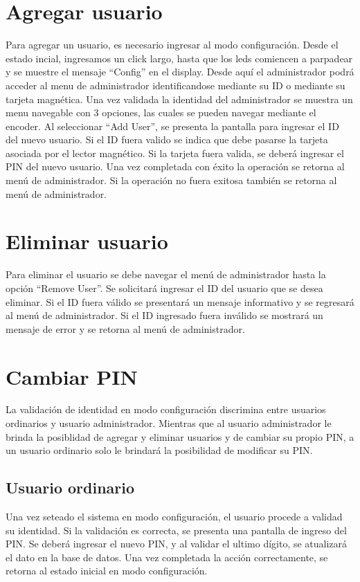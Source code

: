 \documentclass[10pt,a4paper]{article}
\begin{document}
\section{Agregar usuario}
Para agregar un usuario, es necesario ingresar al modo configuración. Desde el estado incial, ingresamos un click largo, hasta que los leds comiencen a parpadear y se muestre el mensaje ``Config'' en el display. Desde aquí el administrador podrá acceder al menu de administrador identificandose mediante su ID o mediante su tarjeta magnética. Una vez validada la identidad del administrador se muestra un menu navegable con 3 opciones, las cuales se pueden navegar mediante el encoder. Al seleccionar ``Add User'', se presenta la pantalla para ingresar el ID del nuevo usuario. Si el ID fuera valido se indica que debe pasarse la tarjeta asociada por el lector magnético. Si la tarjeta fuera valida, se deberá ingresar el PIN del nuevo usuario. Una vez completada con éxito la operación se retorna al menú de administrador. Si la operación no fuera exitosa también se retorna al menú de administrador.

\section{Eliminar usuario}
Para eliminar el usuario se debe navegar el menú de administrador hasta la opción ``Remove User''. Se solicitará ingresar el ID del usuario que se desea eliminar. Si el ID fuera válido se presentará un mensaje informativo y se regresará al menú de administrador. Si el ID ingresado fuera inválido se mostrará un mensaje de error y se retorna al menú de administrador.

\section{Cambiar PIN}
La validación de identidad en modo configuración discrimina entre usuarios ordinarios y usuario administrador. Mientras que al usuario administrador le brinda la posiblidad de agregar y eliminar usuarios y de cambiar su propio PIN, a un usuario ordinario solo le brindará la posibilidad de modificar su PIN.

\subsection{Usuario ordinario}
Una vez seteado el sistema en modo configuración, el usuario procede a validad su identidad. Si la validación es correcta, se presenta una pantalla de ingreso del PIN. Se deberá ingresar el nuevo PIN, y al validar el ultimo dígito, se atualizará el dato en la base de datos. Una vez completada la acción correctamente, se retorna al estado inicial en modo configuración.
\end{document}
